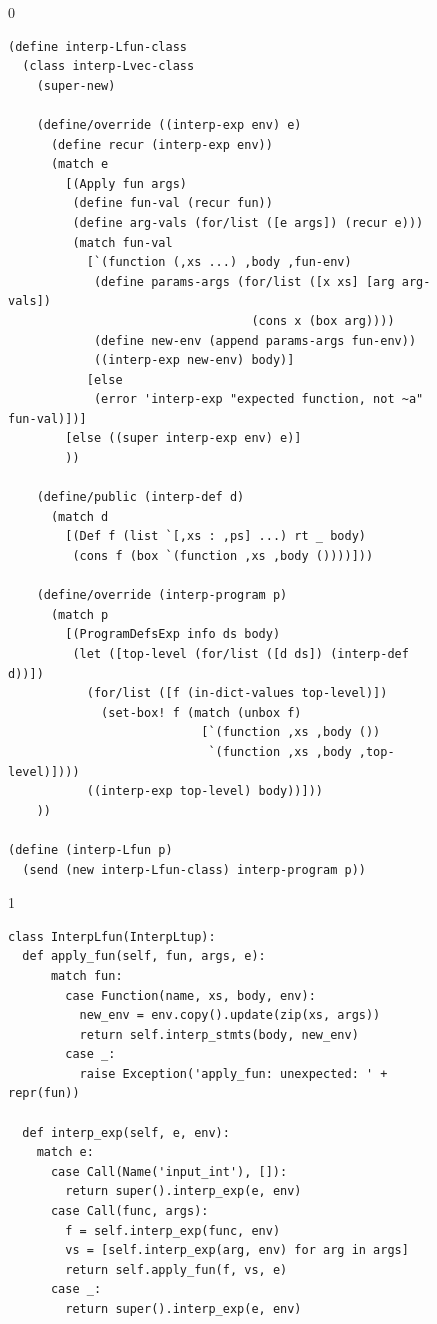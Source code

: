 \documentclass[7x10]{TimesAPriori_MIT}%
\def\racketEd{0}
\def\pythonEd{1}
\def\edition{1}
\newcommand{\pythonColor}[0]{}
\numberwithin{theorem}{chapter}
\numberwithin{definition}{chapter}
\numberwithin{equation}{chapter}
\begin{document}
\begin{figure}[tp]
  \begin{tcolorbox}[colback=white]
    {\if\edition\racketEd  
\begin{lstlisting}
(define interp-Lfun-class
  (class interp-Lvec-class
    (super-new)

    (define/override ((interp-exp env) e)
      (define recur (interp-exp env))
      (match e
        [(Apply fun args)
         (define fun-val (recur fun))
         (define arg-vals (for/list ([e args]) (recur e)))
         (match fun-val
           [`(function (,xs ...) ,body ,fun-env)
            (define params-args (for/list ([x xs] [arg arg-vals])
                                  (cons x (box arg))))
            (define new-env (append params-args fun-env))
            ((interp-exp new-env) body)]
           [else
            (error 'interp-exp "expected function, not ~a" fun-val)])]
        [else ((super interp-exp env) e)]
        ))

    (define/public (interp-def d)
      (match d
        [(Def f (list `[,xs : ,ps] ...) rt _ body)
         (cons f (box `(function ,xs ,body ())))]))

    (define/override (interp-program p)
      (match p
        [(ProgramDefsExp info ds body)
         (let ([top-level (for/list ([d ds]) (interp-def d))])
           (for/list ([f (in-dict-values top-level)])
             (set-box! f (match (unbox f)
                           [`(function ,xs ,body ())
                            `(function ,xs ,body ,top-level)])))
           ((interp-exp top-level) body))]))
    ))

(define (interp-Lfun p)
  (send (new interp-Lfun-class) interp-program p))
\end{lstlisting}
\fi}
{\if\edition\pythonEd\pythonColor
\begin{lstlisting}
class InterpLfun(InterpLtup):
  def apply_fun(self, fun, args, e):
      match fun:
        case Function(name, xs, body, env):
          new_env = env.copy().update(zip(xs, args))
          return self.interp_stmts(body, new_env)
        case _:
          raise Exception('apply_fun: unexpected: ' + repr(fun))
    
  def interp_exp(self, e, env):
    match e:
      case Call(Name('input_int'), []):
        return super().interp_exp(e, env)      
      case Call(func, args):
        f = self.interp_exp(func, env)
        vs = [self.interp_exp(arg, env) for arg in args]
        return self.apply_fun(f, vs, e)
      case _:
        return super().interp_exp(e, env)


\end{lstlisting}}
\end{tcolorbox}
\end{figure}
\end{document}
